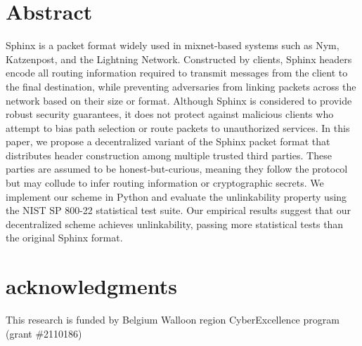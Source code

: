 \documentclass[a4paper,12pt]{article}
\begin{document}


\section*{Abstract}
  Sphinx is a packet format widely used in mixnet-based systems such as Nym, Katzenpost, and the Lightning Network. 
  Constructed by clients, Sphinx headers encode all routing information required to transmit messages from the client to the final destination, while preventing adversaries from linking packets across the network based on their size or format. 
  Although Sphinx is considered to provide robust security guarantees, it does not protect against malicious clients who attempt to bias path selection or route packets to unauthorized services.
  In this paper, we propose a decentralized variant of the Sphinx packet format that distributes header construction among multiple trusted third parties. 
  These parties are assumed to be honest-but-curious, meaning they follow the protocol but may collude to infer routing information or cryptographic secrets. 
  We implement our scheme in Python and evaluate the unlinkability property using the NIST SP 800-22 statistical test suite. 
  Our empirical results suggest that our decentralized scheme achieves unlinkability, passing more statistical tests than the original Sphinx format.









\section*{acknowledgments}
This research is funded by Belgium Walloon region CyberExcellence program (grant \#2110186)



\end{document}
